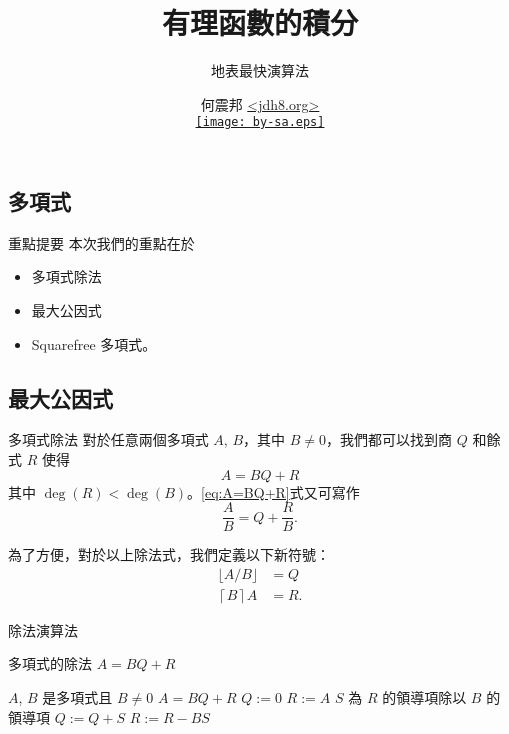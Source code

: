\documentclass{beamer}
\title[積分有理函數]{有理函數的積分}
\subtitle{地表最快演算法}
\author[何震邦]{何震邦 \href{http://jdh8.org/}{\textless jdh8.org\textgreater}\\
    \href{http://creativecommons.org/licenses/by-sa/3.0/tw/deed.zh\textunderscore TW}{\texttt{[image: by-sa.eps]}}}
\theoremstyle{remark}
\begin{document}
\begin{CJK}{UTF8}{bsmi}
\maketitle

\section{多項式}
\begin{frame}{重點提要}
  本次我們的重點在於
  \begin{itemize}
    \item 多項式除法
    \item 最大公因式
    \item Squarefree 多項式。
  \end{itemize}
\end{frame}

\subsection{最大公因式}
\begin{frame}{多項式除法}
  對於任意兩個多項式 $A$, $B$，其中 $B \ne 0$，我們都可以找到商 $Q$ 和餘式 $R$ 使得
  \begin{equation}
    A = BQ + R \label{eq:A=BQ+R}
  \end{equation}
  其中 $\deg(R) < \deg(B)$。\eqref{eq:A=BQ+R}式又可寫作
  \[\frac A B = Q + \frac R B.\]
  \begin{definition}
    為了方便，對於以上除法式，我們定義以下新符號：
    \begin{align*}
      \lfloor A/B \rfloor &= Q\\
      \left\lceil B \right\rceil A &= R.
    \end{align*}
  \end{definition}
\end{frame}

\begin{frame}{除法演算法}
  \begin{algorithm}[H]
    \caption{多項式的除法 $A = BQ + R$}
    \begin{algorithmic}[1]
      \REQUIRE $A$, $B$ 是多項式且 $B \ne 0$
      \ENSURE  $A = BQ + R$
      \STATE $Q := 0$
      \STATE $R := A$
	\STATE $S$ 為 $R$ 的領導項除以 $B$ 的領導項
	\STATE $Q := Q + S$
	\STATE $R := R - BS$
      \ENDWHILE
    \end{algorithmic}
  \end{algorithm}
\end{frame}


\end{CJK}
\end{document}
